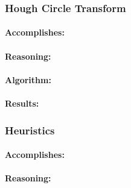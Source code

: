 
\subsubsection{Hough Circle Transform}
\label{subsubsec:hough_circle_transform}

\paragraph*{Accomplishes:}\mbox{}\par

\paragraph*{Reasoning:}\mbox{}\par

\paragraph*{Algorithm:}\mbox{}\par

\paragraph*{Results:}\mbox{}\par


\subsubsection{Heuristics}
\label{subsubsec:heuristics}

\paragraph*{Accomplishes:}\mbox{}\par

\paragraph*{Reasoning:}\mbox{}\par

